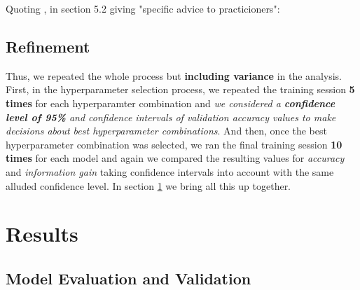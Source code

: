 \documentclass[10pt,journal,compsoc, onecolumn]{IEEEtran}
\begin{document}
Quoting \cite{Zhang}, in section 5.2 giving "specific advice to practicioners": 


\subsection{Refinement}\label{sec:refinement}
Thus, we repeated the whole process but \textbf{including variance} in the analysis. First, in the hyperparameter selection process, we repeated the training session \textbf{5 times} for each hyperparamter combination and \emph{we considered a \textbf{confidence level of 95\%} and confidence intervals of validation accuracy values to make decisions about best hyperparameter combinations}. And then, once the best hyperparameter combination was selected, we ran the final training session \textbf{10 times} for each model and again we compared the resulting values for \textit{accuracy} and \textit{information gain} taking confidence intervals into account with the same alluded confidence level. In section \ref{sec:results} we bring all this up together.

\section{Results}\label{sec:results}
\subsection{Model Evaluation and Validation}
\end{document}
